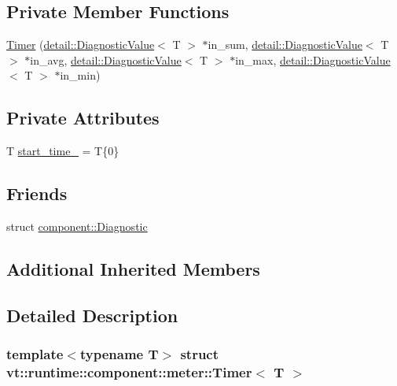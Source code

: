 \subsection*{Private Member Functions}
\begin{DoxyCompactItemize}
\item 
\hyperlink{structvt_1_1runtime_1_1component_1_1meter_1_1_timer_afc814a211d7354cad6e64783e1f8fe8a}{Timer} (\hyperlink{structvt_1_1runtime_1_1component_1_1detail_1_1_diagnostic_value}{detail\+::\+Diagnostic\+Value}$<$ T $>$ $\ast$in\+\_\+sum, \hyperlink{structvt_1_1runtime_1_1component_1_1detail_1_1_diagnostic_value}{detail\+::\+Diagnostic\+Value}$<$ T $>$ $\ast$in\+\_\+avg, \hyperlink{structvt_1_1runtime_1_1component_1_1detail_1_1_diagnostic_value}{detail\+::\+Diagnostic\+Value}$<$ T $>$ $\ast$in\+\_\+max, \hyperlink{structvt_1_1runtime_1_1component_1_1detail_1_1_diagnostic_value}{detail\+::\+Diagnostic\+Value}$<$ T $>$ $\ast$in\+\_\+min)
\end{DoxyCompactItemize}
\subsection*{Private Attributes}
\begin{DoxyCompactItemize}
\item 
T \hyperlink{structvt_1_1runtime_1_1component_1_1meter_1_1_timer_a097137934875f01d9e9ed8653916df64}{start\+\_\+time\+\_\+} = T\{0\}
\end{DoxyCompactItemize}
\subsection*{Friends}
\begin{DoxyCompactItemize}
\item 
struct \hyperlink{structvt_1_1runtime_1_1component_1_1meter_1_1_timer_a48f263de9dbf26c1fc7736031cca9613}{component\+::\+Diagnostic}
\end{DoxyCompactItemize}
\subsection*{Additional Inherited Members}


\subsection{Detailed Description}
\subsubsection*{template$<$typename T$>$\newline
struct vt\+::runtime\+::component\+::meter\+::\+Timer$<$ T $>$}

